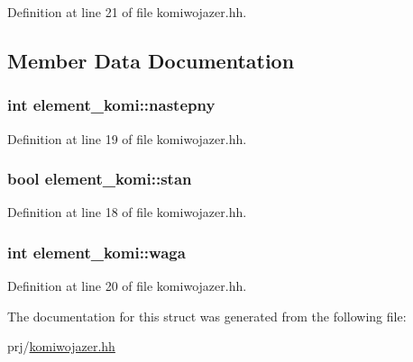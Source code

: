 \-Definition at line 21 of file komiwojazer.\-hh.



\subsection{\-Member \-Data \-Documentation}
\hypertarget{structelement__komi_a30a791cf42a38534bf589661aaf680d5}{
\subsubsection[{nastepny}]{\setlength{\rightskip}{0pt plus 5cm}int {\bf element\-\_\-komi\-::nastepny}}}\label{structelement__komi_a30a791cf42a38534bf589661aaf680d5}


\-Definition at line 19 of file komiwojazer.\-hh.

\hypertarget{structelement__komi_a85030e1988969c8bd43cafbb006a8bff}{
\subsubsection[{stan}]{\setlength{\rightskip}{0pt plus 5cm}bool {\bf element\-\_\-komi\-::stan}}}\label{structelement__komi_a85030e1988969c8bd43cafbb006a8bff}


\-Definition at line 18 of file komiwojazer.\-hh.

\hypertarget{structelement__komi_a6d353ba2bf60e3e6161af6957edf2be0}{
\subsubsection[{waga}]{\setlength{\rightskip}{0pt plus 5cm}int {\bf element\-\_\-komi\-::waga}}}\label{structelement__komi_a6d353ba2bf60e3e6161af6957edf2be0}


\-Definition at line 20 of file komiwojazer.\-hh.



\-The documentation for this struct was generated from the following file\-:\begin{DoxyCompactItemize}
\item 
prj/\hyperlink{komiwojazer_8hh}{komiwojazer.\-hh}\end{DoxyCompactItemize}
